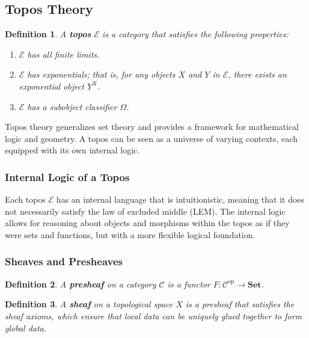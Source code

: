 \documentclass{article}
\newtheorem{definition}{Definition}[section]
\begin{document}
\subsection{Topos Theory}

\begin{definition}
    A \textbf{topos} $\mathcal{E}$ is a category that satisfies the following properties:
    \begin{enumerate}
        \item $\mathcal{E}$ has all finite limits.
        \item $\mathcal{E}$ has exponentials; that is, for any objects $X$ and $Y$ in $\mathcal{E}$, there exists an exponential object $Y^X$.
        \item $\mathcal{E}$ has a subobject classifier $\Omega$.
    \end{enumerate}
\end{definition}

Topos theory generalizes set theory and provides a framework for mathematical logic and geometry. A topos can be seen as a universe of varying contexts, each equipped with its own internal logic.

\subsubsection{Internal Logic of a Topos}

Each topos $\mathcal{E}$ has an internal language that is intuitionistic, meaning that it does not necessarily satisfy the law of excluded middle (LEM). The internal logic allows for reasoning about objects and morphisms within the topos as if they were sets and functions, but with a more flexible logical foundation.

\subsubsection{Sheaves and Presheaves}

\begin{definition}
    A \textbf{presheaf} on a category $\mathcal{C}$ is a functor $F \colon \mathcal{C}^{\text{op}} \to \mathbf{Set}$.
\end{definition}

\begin{definition}
    A \textbf{sheaf} on a topological space $X$ is a presheaf that satisfies the sheaf axioms, which ensure that local data can be uniquely glued together to form global data.
\end{definition}
\end{document}
